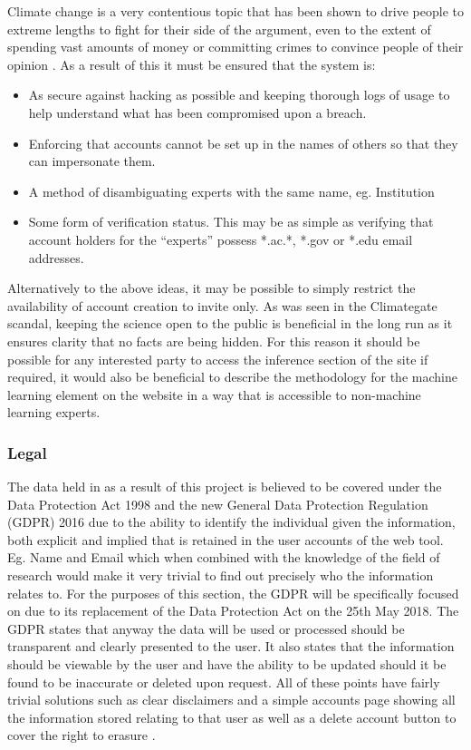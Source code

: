 \documentclass{ecmm427_assignment}
\begin{document}
\quad Climate change is a very contentious topic that has been shown to
drive people to extreme lengths to fight for their side of the argument,
even to the extent of spending vast amounts of money or committing
crimes to convince people of their opinion \cite{nerlich2010climategate}. As a result
of this it must be ensured that the system is:
\begin{itemize}
\item As secure against hacking as possible and keeping thorough logs of
usage to help understand what has been compromised upon a breach.
\item Enforcing that accounts cannot be set up in the names of others so
that they can impersonate them. 
\item A method of disambiguating experts with the same name, eg. Institution
\item Some form of verification status. This may be as simple as verifying
that account holders for the ``experts'' possess {*}.ac.{*}, {*}.gov
or {*}.edu email addresses. 
\end{itemize}
\quad Alternatively to the above ideas, it may be possible to simply restrict
the availability of account creation to invite only. As was seen in
the Climategate scandal, keeping the science open to the public is
beneficial in the long run as it ensures clarity that no facts are
being hidden. For this reason it should be possible for any interested
party to access the inference section of the site if required, it
would also be beneficial to describe the methodology for the machine learning
element on the website in a way that is accessible to non-machine
learning experts.

\subsubsection{Legal }

\quad The data held in as a result of this project is believed to be covered
under the Data Protection Act 1998 and the new General Data Protection
Regulation (GDPR) 2016 due to the ability to identify the individual
given the information, both explicit and implied that is retained in
the user accounts of the web tool. Eg. Name and Email which when combined
with the knowledge of the field of research would make it very trivial
to find out precisely who the information relates to. For the purposes
of this section, the GDPR will be specifically focused on due to its
replacement of the Data Protection Act on the 25th May 2018. The GDPR
states that anyway the data will be used or processed should be
transparent and clearly presented to the user. It also states that
the information should be viewable by the user and have the ability
to be updated should it be found to be inaccurate or deleted upon
request. All of these points have fairly trivial solutions such as
clear disclaimers and a simple accounts page showing all the information
stored relating to that user as well as a delete account button to
cover the right to erasure \cite{eu:gdpr}. \\
\end{document}
